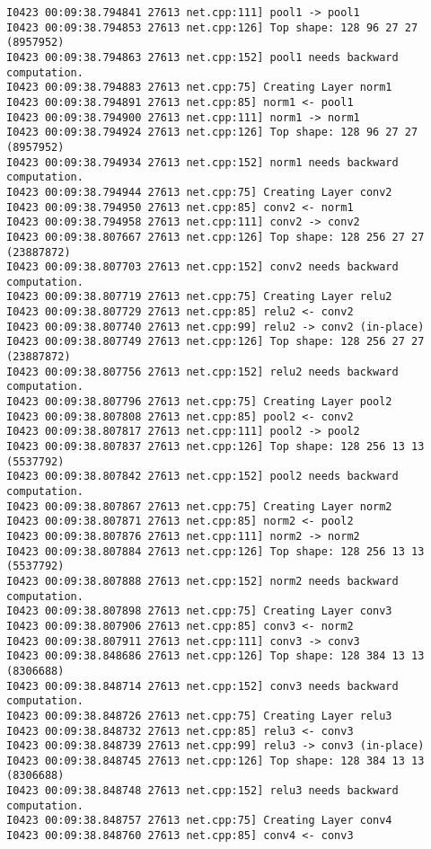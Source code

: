\documentclass[a4]{article}
\begin{document}
\begin{lstlisting}
I0423 00:09:38.794841 27613 net.cpp:111] pool1 -> pool1
I0423 00:09:38.794853 27613 net.cpp:126] Top shape: 128 96 27 27 (8957952)
I0423 00:09:38.794863 27613 net.cpp:152] pool1 needs backward computation.
I0423 00:09:38.794883 27613 net.cpp:75] Creating Layer norm1
I0423 00:09:38.794891 27613 net.cpp:85] norm1 <- pool1
I0423 00:09:38.794900 27613 net.cpp:111] norm1 -> norm1
I0423 00:09:38.794924 27613 net.cpp:126] Top shape: 128 96 27 27 (8957952)
I0423 00:09:38.794934 27613 net.cpp:152] norm1 needs backward computation.
I0423 00:09:38.794944 27613 net.cpp:75] Creating Layer conv2
I0423 00:09:38.794950 27613 net.cpp:85] conv2 <- norm1
I0423 00:09:38.794958 27613 net.cpp:111] conv2 -> conv2
I0423 00:09:38.807667 27613 net.cpp:126] Top shape: 128 256 27 27 (23887872)
I0423 00:09:38.807703 27613 net.cpp:152] conv2 needs backward computation.
I0423 00:09:38.807719 27613 net.cpp:75] Creating Layer relu2
I0423 00:09:38.807729 27613 net.cpp:85] relu2 <- conv2
I0423 00:09:38.807740 27613 net.cpp:99] relu2 -> conv2 (in-place)
I0423 00:09:38.807749 27613 net.cpp:126] Top shape: 128 256 27 27 (23887872)
I0423 00:09:38.807756 27613 net.cpp:152] relu2 needs backward computation.
I0423 00:09:38.807796 27613 net.cpp:75] Creating Layer pool2
I0423 00:09:38.807808 27613 net.cpp:85] pool2 <- conv2
I0423 00:09:38.807817 27613 net.cpp:111] pool2 -> pool2
I0423 00:09:38.807837 27613 net.cpp:126] Top shape: 128 256 13 13 (5537792)
I0423 00:09:38.807842 27613 net.cpp:152] pool2 needs backward computation.
I0423 00:09:38.807867 27613 net.cpp:75] Creating Layer norm2
I0423 00:09:38.807871 27613 net.cpp:85] norm2 <- pool2
I0423 00:09:38.807876 27613 net.cpp:111] norm2 -> norm2
I0423 00:09:38.807884 27613 net.cpp:126] Top shape: 128 256 13 13 (5537792)
I0423 00:09:38.807888 27613 net.cpp:152] norm2 needs backward computation.
I0423 00:09:38.807898 27613 net.cpp:75] Creating Layer conv3
I0423 00:09:38.807906 27613 net.cpp:85] conv3 <- norm2
I0423 00:09:38.807911 27613 net.cpp:111] conv3 -> conv3
I0423 00:09:38.848686 27613 net.cpp:126] Top shape: 128 384 13 13 (8306688)
I0423 00:09:38.848714 27613 net.cpp:152] conv3 needs backward computation.
I0423 00:09:38.848726 27613 net.cpp:75] Creating Layer relu3
I0423 00:09:38.848732 27613 net.cpp:85] relu3 <- conv3
I0423 00:09:38.848739 27613 net.cpp:99] relu3 -> conv3 (in-place)
I0423 00:09:38.848745 27613 net.cpp:126] Top shape: 128 384 13 13 (8306688)
I0423 00:09:38.848748 27613 net.cpp:152] relu3 needs backward computation.
I0423 00:09:38.848757 27613 net.cpp:75] Creating Layer conv4
I0423 00:09:38.848760 27613 net.cpp:85] conv4 <- conv3

\end{lstlisting}
\end{document}
